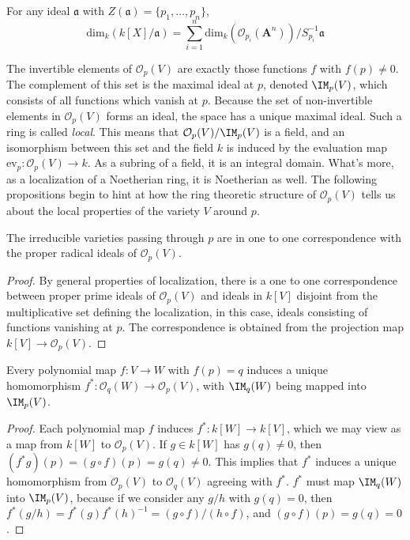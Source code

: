 \begin{corollary}
    For any ideal $\mathfrak{a}$ with $Z(\mathfrak{a}) = \{ p_1,\dots, p_n \}$,
    \[ \text{dim}_k(k[X]/\mathfrak{a}) = \sum_{i = 1}^n \text{dim}_k(\mathcal{O}_{p_i}(\mathbf{A}^n))/S_{p_i}^{-1} \mathfrak{a} \]
\end{corollary}

The invertible elements of $\mathcal{O}_p(V)$ are exactly those functions $f$ with $f(p) \neq 0$. The complement of this set is the maximal ideal at $p$, denoted $\IM_p(V)$, which consists of all functions which vanish at $p$. Because the set of non-invertible elements in $\mathcal{O}_p(V)$ forms an ideal, the space has a unique maximal ideal. Such a ring is called \emph{local}. This means that $\mathcal{O}_p(V)/\IM_p(V)$ is a field, and an isomorphism between this set and the field $k$ is induced by the evaluation map $\text{ev}_p: \mathcal{O}_p(V) \to k$. As a subring of a field, it is an integral domain. What's more, as a localization of a Noetherian ring, it is Noetherian as well. The following propositions begin to hint at how the ring theoretic structure of $\mathcal{O}_p(V)$ tells us about the local properties of the variety $V$ around $p$.

\begin{prop}
    The irreducible varieties passing through $p$ are in one to one correspondence with the proper radical ideals of $\mathcal{O}_p(V)$.
\end{prop}
\begin{proof}
    By general properties of localization, there is a one to one correspondence between proper prime ideals of $\mathcal{O}_p(V)$ and ideals in $k[V]$ disjoint from the multiplicative set defining the localization, in this case, ideals consisting of functions vanishing at $p$. The correspondence is obtained from the projection map $k[V] \to \mathcal{O}_p(V)$.
\end{proof}

\begin{prop}
    Every polynomial map $f: V \to W$ with $f(p) = q$ induces a unique homomorphism $f^*: \mathcal{O}_q(W) \to \mathcal{O}_p(V)$, with $\IM_q(W)$ being mapped into $\IM_p(V)$.
\end{prop}
\begin{proof}
    Each polynomial map $f$ induces $f^*: k[W] \to k[V]$, which we may view as a map from $k[W]$ to $\mathcal{O}_p(V)$. If $g \in k[W]$ has $g(q) \neq 0$, then $(f^* g)(p) = (g \circ f)(p) = g(q) \neq 0$. This implies that $f^*$ induces a unique homomorphism from $\mathcal{O}_p(V)$ to $\mathcal{O}_q(V)$ agreeing with $f^*$. $f^*$ must map $\IM_q(W)$ into $\IM_p(V)$, because if we consider any $g/h$ with $g(q) = 0$, then $f^*(g/h) = f^*(g)f^*(h)^{-1} = (g \circ f)/(h \circ f)$, and $(g \circ f)(p) = g(q) = 0$.
\end{proof}

